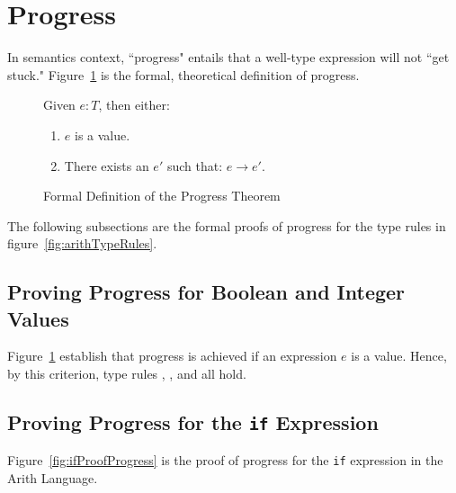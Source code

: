 \documentclass{report}
\newcommand{\rel}[1]{ \mbox{\sc [#1]} }
\begin{document}
\eject
\section{Progress}\label{sec:progress}

In semantics context, ``progress" entails that a well-type expression will not ``get stuck."  Figure~\ref{fig:progressTheorem} is the formal, theoretical definition of progress.

\begin{figure}[H]

	Given $e : T$, then either:
	
	\begin{enumerate}
	
      \item $e$ is a value.
      
      \item There exists an $e'$ such that: $e \rightarrow e'$.
	
	\end{enumerate}
	
  \caption{Formal Definition of the Progress Theorem}\label{fig:progressTheorem}
\end{figure}

The following subsections are the formal proofs of progress for the type rules in figure~\ref{fig:arithTypeRules}.

\subsection{Proving Progress for Boolean and Integer Values}

Figure~\ref{fig:progressTheorem} establish that progress is achieved if an expression $e$ is a value.  Hence, by this criterion, type rules \rel{T-True}, \rel{T-False}, and \rel{T-Int} all hold.

\subsection{Proving Progress for the \texttt{if} Expression}

Figure~\ref{fig:ifProofProgress} is the proof of progress for the \texttt{if} expression in the Arith Language.
\end{document}
